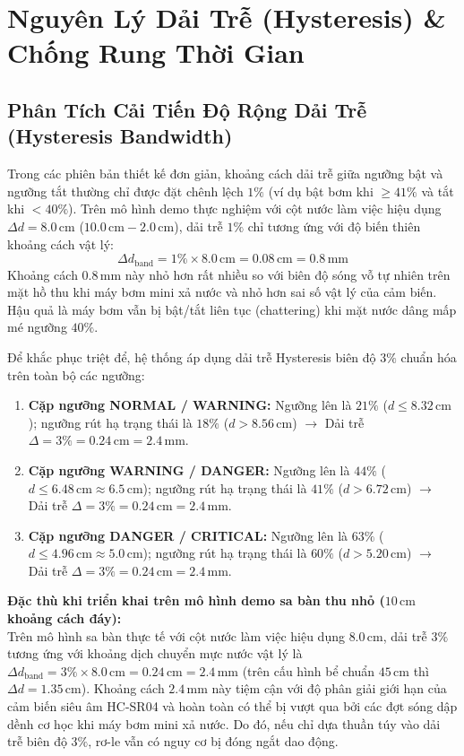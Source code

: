 \section{Nguyên Lý Dải Trễ (Hysteresis) \& Chống Rung Thời Gian}
\label{sec:hysteresis_analysis}

\subsection{Phân Tích Cải Tiến Độ Rộng Dải Trễ (Hysteresis Bandwidth)}
Trong các phiên bản thiết kế đơn giản, khoảng cách dải trễ giữa ngưỡng bật và ngưỡng tắt thường chỉ được đặt chênh lệch $1\%$ (ví dụ bật bơm khi $\ge 41\%$ và tắt khi $< 40\%$). Trên mô hình demo thực nghiệm với cột nước làm việc hiệu dụng $\Delta d = 8.0\,\text{cm}$ ($10.0\,\text{cm} - 2.0\,\text{cm}$), dải trễ $1\%$ chỉ tương ứng với độ biến thiên khoảng cách vật lý:
\begin{equation}
\Delta d_{\text{band}} = 1\% \times 8.0\,\text{cm} = 0.08\,\text{cm} = 0.8\,\text{mm}
\end{equation}
Khoảng cách $0.8\,\text{mm}$ này nhỏ hơn rất nhiều so với biên độ sóng vỗ tự nhiên trên mặt hồ thu khi máy bơm mini xả nước và nhỏ hơn sai số vật lý của cảm biến. Hậu quả là máy bơm vẫn bị bật/tắt liên tục (chattering) khi mặt nước dâng mấp mé ngưỡng $40\%$.

Để khắc phục triệt để, hệ thống áp dụng dải trễ Hysteresis biên độ $3\%$ chuẩn hóa trên toàn bộ các ngưỡng:
\begin{enumerate}
    \item \textbf{Cặp ngưỡng NORMAL / WARNING:} Ngưỡng lên là $21\%$ ($d \le 8.32\,\text{cm}$); ngưỡng rút hạ trạng thái là $18\%$ ($d > 8.56\,\text{cm}$) $\to$ Dải trễ $\Delta = 3\% = 0.24\,\text{cm} = 2.4\,\text{mm}$.
    \item \textbf{Cặp ngưỡng WARNING / DANGER:} Ngưỡng lên là $44\%$ ($d \le 6.48\,\text{cm} \approx 6.5\,\text{cm}$); ngưỡng rút hạ trạng thái là $41\%$ ($d > 6.72\,\text{cm}$) $\to$ Dải trễ $\Delta = 3\% = 0.24\,\text{cm} = 2.4\,\text{mm}$.
    \item \textbf{Cặp ngưỡng DANGER / CRITICAL:} Ngưỡng lên là $63\%$ ($d \le 4.96\,\text{cm} \approx 5.0\,\text{cm}$); ngưỡng rút hạ trạng thái là $60\%$ ($d > 5.20\,\text{cm}$) $\to$ Dải trễ $\Delta = 3\% = 0.24\,\text{cm} = 2.4\,\text{mm}$.
\end{enumerate}

\noindent\textbf{Đặc thù khi triển khai trên mô hình demo sa bàn thu nhỏ ($10\,\text{cm}$ khoảng cách đáy):}\\
Trên mô hình sa bàn thực tế với cột nước làm việc hiệu dụng $8.0\,\text{cm}$, dải trễ $3\%$ tương ứng với khoảng dịch chuyển mực nước vật lý là $\Delta d_{\text{band}} = 3\% \times 8.0\,\text{cm} = 0.24\,\text{cm} = 2.4\,\text{mm}$ (trên cấu hình bể chuẩn $45\,\text{cm}$ thì $\Delta d = 1.35\,\text{cm}$). Khoảng cách $2.4\,\text{mm}$ này tiệm cận với độ phân giải giới hạn của cảm biến siêu âm HC-SR04 và hoàn toàn có thể bị vượt qua bởi các đợt sóng dập dềnh cơ học khi máy bơm mini xả nước. Do đó, nếu chỉ dựa thuần túy vào dải trễ biên độ $3\%$, rơ-le vẫn có nguy cơ bị đóng ngắt dao động. 


